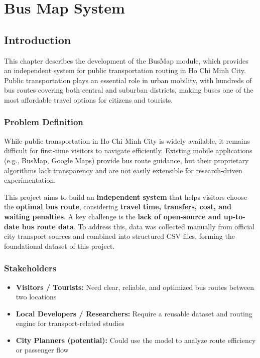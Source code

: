 \chapter{Bus Map System}
\label{chap:busmap}

\section{Introduction}

This chapter describes the development of the BusMap module, which provides an independent system for public transportation routing in Ho Chi Minh City. Public transportation plays an essential role in urban mobility, with hundreds of bus routes covering both central and suburban districts, making buses one of the most affordable travel options for citizens and tourists.

\subsection{Problem Definition}

While public transportation in Ho Chi Minh City is widely available, it remains difficult for first-time visitors to navigate efficiently. Existing mobile applications (e.g., BusMap, Google Maps) provide bus route guidance, but their proprietary algorithms lack transparency and are not easily extensible for research-driven experimentation.

This project aims to build an \textbf{independent system} that helps visitors choose the \textbf{optimal bus route}, considering \textbf{travel time, transfers, cost, and waiting penalties}. A key challenge is the \textbf{lack of open-source and up-to-date bus route data}. To address this, data was collected manually from official city transport sources and combined into structured CSV files, forming the foundational dataset of this project.

\subsection{Stakeholders}

\begin{itemize}
    \item \textbf{Visitors / Tourists:} Need clear, reliable, and optimized bus routes between two locations
    \item \textbf{Local Developers / Researchers:} Require a reusable dataset and routing engine for transport-related studies
    \item \textbf{City Planners (potential):} Could use the model to analyze route efficiency or passenger flow
\end{itemize}

